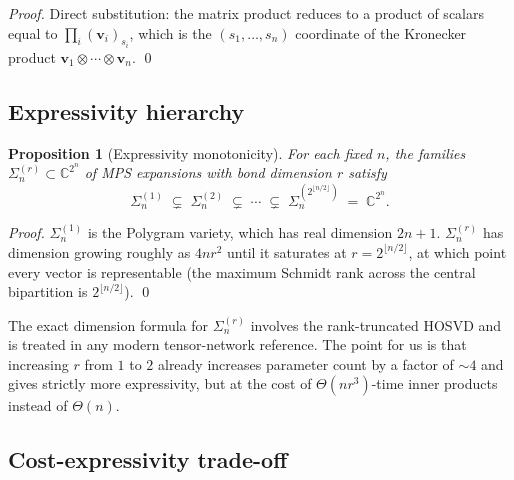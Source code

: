 \documentclass[11pt,letterpaper]{article}
\newtheorem{proposition}[theorem]{Proposition}
\theoremstyle{definition}
\newcommand{\C}{\mathbb{C}}
\begin{document}
\begin{proof}
Direct substitution: the matrix product reduces to a product of scalars equal
to $\prod_{i} (\bm{v}_{i})_{s_{i}}$, which is the $(s_{1}, \dots, s_{n})$
coordinate of the Kronecker product $\bm{v}_{1} \otimes \cdots \otimes
\bm{v}_{n}$. \qed
\end{proof}

\subsection{Expressivity hierarchy}

\begin{proposition}[Expressivity monotonicity]
\label{prop:exp-monotonicity}
For each fixed $n$, the families $\Sigma_{n}^{(r)} \subset \C^{2^{n}}$ of MPS
expansions with bond dimension $r$ satisfy
\[
\Sigma_{n}^{(1)} \;\subsetneq\; \Sigma_{n}^{(2)} \;\subsetneq\; \cdots
\;\subsetneq\; \Sigma_{n}^{(2^{\lfloor n/2 \rfloor})} \;=\; \C^{2^{n}}.
\]
\end{proposition}

\begin{proof}
$\Sigma_{n}^{(1)}$ is the Polygram variety, which has real dimension $2n + 1$.
$\Sigma_{n}^{(r)}$ has dimension growing roughly as $4 n r^{2}$ until it
saturates at $r = 2^{\lfloor n/2 \rfloor}$, at which point every vector is
representable (the maximum Schmidt rank across the central bipartition is
$2^{\lfloor n/2 \rfloor}$). \qed
\end{proof}

The exact dimension formula for $\Sigma_{n}^{(r)}$ involves the rank-truncated
HOSVD and is treated in any modern tensor-network reference. The point for us
is that increasing $r$ from $1$ to $2$ already increases parameter count by
a factor of $\sim 4$ and gives strictly more expressivity, but at the cost
of $\Theta(n r^{3})$-time inner products instead of $\Theta(n)$.

\subsection{Cost-expressivity trade-off}
\end{document}
